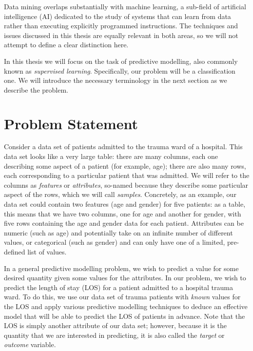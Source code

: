 Data mining overlaps substantially with machine learning, a sub-field of
artificial intelligence (AI) dedicated to the study of systems that can learn
from data rather than executing explicitly programmed instructions. The
techniques and issues discussed in this thesis are equally relevant in both
areas, so we will not attempt to define a clear distinction here.


In this thesis we will focus on the task of predictive modelling, also
commonly known as \textit{supervised learning}. Specifically,
our problem will be a classification one. We will introduce the necessary
terminology in the next section as we describe the problem.

\section{Problem Statement}
Consider a data set of patients admitted to the trauma ward of a hospital.
This data set looks like a very large table: there are many columns, each one
describing some aspect of a patient (for example, age); there are also many
rows, each corresponding to a particular patient that was admitted. We will
refer to the columns as \textit{features} or \textit{attributes}, so-named
because they describe some particular aspect of the rows, which we will call
\textit{samples}. Concretely, as an example, our data set could contain
two features (age and gender) for five patients: as a table, this means that
we have two columns, one for age and another for gender, with five rows
containing the age and gender data for each patient. Attributes can be numeric
(such as age) and potentially take on an infinite number of different values,
or categorical (such as gender) and can only have one of a limited, pre-defined
list of values.

In a general predictive modelling problem, we wish to predict a value for some
desired quantity given some values for the attributes. In our problem, we wish
to predict the length of stay (LOS) for a patient admitted to a hospital trauma
ward. To do this, we use our data set of trauma patients with \textit{known}
values for the LOS and apply various predictive modelling techniques to deduce
an effective model that will be able to predict the LOS of patients in advance.
Note that the LOS is simply another attribute of our data set; however, because
it is the quantity that we are interested in predicting, it is also called the
\textit{target} or \textit{outcome} variable.

